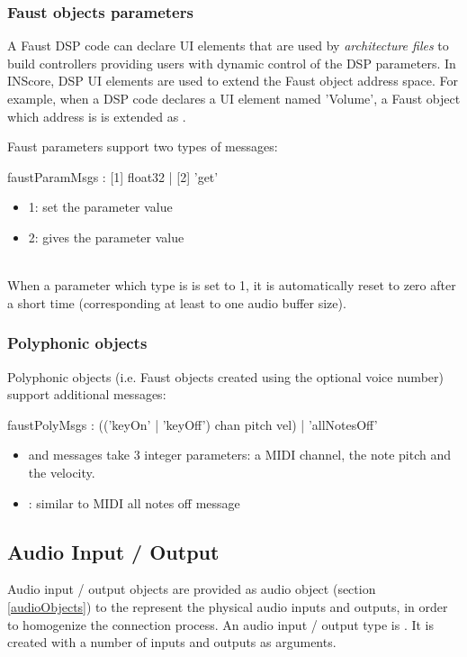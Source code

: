 \documentclass[a4paper,twoside]{article}
\newcommand{\sublevel}[1]	{\subsection{#1}}
\newcommand{\subsublevel}[1]	{\subsubsection{#1}}
\begin{document}
\subsublevel{Faust objects parameters}
\label{webFaustParams}

A Faust DSP code can declare UI elements that are used by \emph{architecture files} to build controllers providing users with dynamic control of the DSP parameters. In INScore, DSP UI elements are used to extend the Faust object address space. For example, when a DSP code declares a UI element named 'Volume', a Faust object which address is  is extended as .

Faust parameters support two types of messages:

\begin{rail}
faustParamMsgs : [1] float32 | [2] 'get'
\end{rail}

\begin{itemize}
\item 1: set the parameter value
\item 2: gives the parameter value
\end{itemize}

\note{}\\
When a parameter which type is  is set to 1, it is automatically reset to zero after a short time (corresponding at least to one audio buffer size).

\subsublevel{Polyphonic objects}
\label{webFaustPoly}

Polyphonic objects (i.e. Faust objects created using the optional voice number) support additional messages:

\begin{rail}
faustPolyMsgs : (('keyOn' | 'keyOff') chan pitch vel)
				| 'allNotesOff'
\end{rail}

\begin{itemize}
\item {} and  messages take 3 integer parameters: a MIDI channel, the note pitch and the velocity.
\item {}: similar to MIDI all notes off message
\end{itemize}

\sublevel{Audio Input / Output}
\label{audioioObjects}

Audio input / output objects are provided as audio object (\see section \ref{audioObjects}) to the represent the physical audio inputs and outputs, in order to homogenize the connection process.
An audio input / output type is . It is created with a number of inputs and outputs as arguments.
\end{document}
